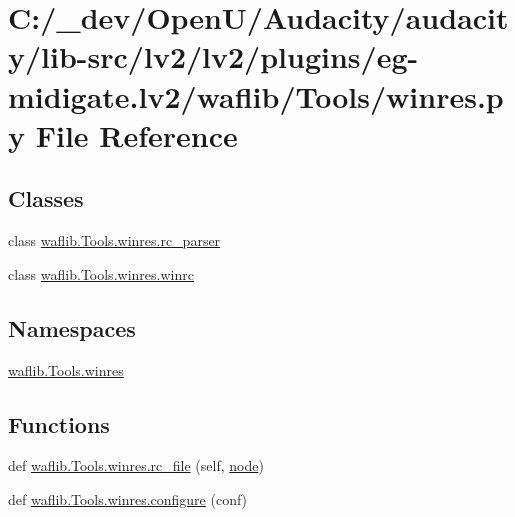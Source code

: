 \hypertarget{lv2_2plugins_2eg-midigate_8lv2_2waflib_2_tools_2winres_8py}{}\section{C\+:/\+\_\+dev/\+Open\+U/\+Audacity/audacity/lib-\/src/lv2/lv2/plugins/eg-\/midigate.lv2/waflib/\+Tools/winres.py File Reference}
\label{lv2_2plugins_2eg-midigate_8lv2_2waflib_2_tools_2winres_8py}
\subsection*{Classes}
\begin{DoxyCompactItemize}
\item 
class \hyperlink{classwaflib_1_1_tools_1_1winres_1_1rc__parser}{waflib.\+Tools.\+winres.\+rc\+\_\+parser}
\item 
class \hyperlink{classwaflib_1_1_tools_1_1winres_1_1winrc}{waflib.\+Tools.\+winres.\+winrc}
\end{DoxyCompactItemize}
\subsection*{Namespaces}
\begin{DoxyCompactItemize}
\item 
 \hyperlink{namespacewaflib_1_1_tools_1_1winres}{waflib.\+Tools.\+winres}
\end{DoxyCompactItemize}
\subsection*{Functions}
\begin{DoxyCompactItemize}
\item 
def \hyperlink{namespacewaflib_1_1_tools_1_1winres_ac3e0ca77b048ed70a3403f4bbda55f9e}{waflib.\+Tools.\+winres.\+rc\+\_\+file} (self, \hyperlink{structnode}{node})
\item 
def \hyperlink{namespacewaflib_1_1_tools_1_1winres_a61d49dde1a942da70092bb59fe817f18}{waflib.\+Tools.\+winres.\+configure} (conf)
\end{DoxyCompactItemize}
